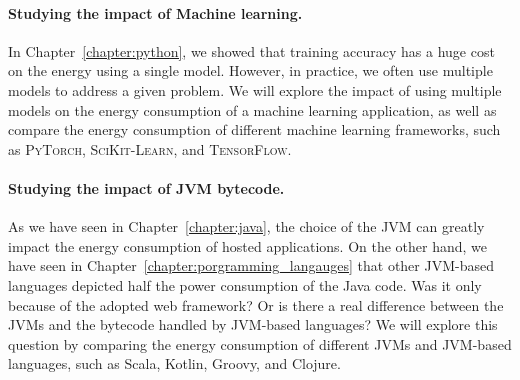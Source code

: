 \paragraph{Studying the impact of Machine learning.}
In Chapter~\ref{chapter:python}, we showed that training accuracy has a huge cost on the energy using a single model.
However, in practice, we often use multiple models to address a given problem.
We will explore the impact of using multiple models on the energy consumption of a machine learning application, as well as compare the energy consumption of different machine learning frameworks, such as \textsc{PyTorch}, \textsc{SciKit-Learn}, and \textsc{TensorFlow}.



\paragraph{Studying the impact of JVM bytecode.}
As we have seen in Chapter~\ref{chapter:java}, the choice of the JVM can greatly impact the energy consumption of hosted applications.
On the other hand, we have seen in Chapter~\ref{chapter:porgramming_langauges} that other JVM-based languages depicted half the power consumption of the Java code.
Was it only because of the adopted web framework?
Or is there a real difference between the JVMs and the bytecode handled by JVM-based languages?
We will explore this question by comparing the energy consumption of different JVMs and JVM-based languages, such as Scala, Kotlin, Groovy, and Clojure.

